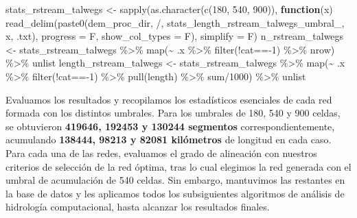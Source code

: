 \documentclass[spanish]{article}
\newenvironment{Shaded}{\begin{snugshade}}{\end{snugshade}}
\newcommand{\AttributeTok}[1]{\textcolor[rgb]{0.77,0.63,0.00}{#1}}
\newcommand{\ControlFlowTok}[1]{\textcolor[rgb]{0.13,0.29,0.53}{\textbf{#1}}}
\newcommand{\DecValTok}[1]{\textcolor[rgb]{0.00,0.00,0.81}{#1}}
\newcommand{\FunctionTok}[1]{\textcolor[rgb]{0.00,0.00,0.00}{#1}}
\newcommand{\NormalTok}[1]{#1}
\newcommand{\OtherTok}[1]{\textcolor[rgb]{0.56,0.35,0.01}{#1}}
\newcommand{\SpecialCharTok}[1]{\textcolor[rgb]{0.00,0.00,0.00}{#1}}
\newcommand{\StringTok}[1]{\textcolor[rgb]{0.31,0.60,0.02}{#1}}
\begin{document}
\begin{Shaded}
\begin{Highlighting}[]
\NormalTok{stats\_rstream\_talwegs }\OtherTok{\textless{}{-}} \FunctionTok{sapply}\NormalTok{(}\FunctionTok{as.character}\NormalTok{(}\FunctionTok{c}\NormalTok{(}\DecValTok{180}\NormalTok{, }\DecValTok{540}\NormalTok{, }\DecValTok{900}\NormalTok{)), }\ControlFlowTok{function}\NormalTok{(x) }
  \FunctionTok{read\_delim}\NormalTok{(}\FunctionTok{paste0}\NormalTok{(dem\_proc\_dir, }\StringTok{\textquotesingle{}/\textquotesingle{}}\NormalTok{, }\StringTok{\textquotesingle{}stats\_length\_rstream\_talwegs\_umbral\_\textquotesingle{}}\NormalTok{, x, }\StringTok{\textquotesingle{}.txt\textquotesingle{}}\NormalTok{),}
             \AttributeTok{progress =}\NormalTok{ F, }\AttributeTok{show\_col\_types =}\NormalTok{ F), }\AttributeTok{simplify =}\NormalTok{ F)}
\NormalTok{n\_rstream\_talwegs }\OtherTok{\textless{}{-}}\NormalTok{ stats\_rstream\_talwegs }\SpecialCharTok{\%\textgreater{}\%} 
  \FunctionTok{map}\NormalTok{(}\SpecialCharTok{\textasciitilde{}}\NormalTok{ .x }\SpecialCharTok{\%\textgreater{}\%} \FunctionTok{filter}\NormalTok{(}\SpecialCharTok{!}\NormalTok{cat}\SpecialCharTok{=={-}}\DecValTok{1}\NormalTok{) }\SpecialCharTok{\%\textgreater{}\%}\NormalTok{ nrow) }\SpecialCharTok{\%\textgreater{}\%}\NormalTok{ unlist}
\NormalTok{length\_rstream\_talwegs }\OtherTok{\textless{}{-}}\NormalTok{ stats\_rstream\_talwegs }\SpecialCharTok{\%\textgreater{}\%}
  \FunctionTok{map}\NormalTok{(}\SpecialCharTok{\textasciitilde{}}\NormalTok{ .x }\SpecialCharTok{\%\textgreater{}\%} \FunctionTok{filter}\NormalTok{(}\SpecialCharTok{!}\NormalTok{cat}\SpecialCharTok{=={-}}\DecValTok{1}\NormalTok{) }\SpecialCharTok{\%\textgreater{}\%} \FunctionTok{pull}\NormalTok{(length) }\SpecialCharTok{\%\textgreater{}\%}\NormalTok{ sum}\SpecialCharTok{/}\DecValTok{1000}\NormalTok{) }\SpecialCharTok{\%\textgreater{}\%}\NormalTok{ unlist}
\end{Highlighting}
\end{Shaded}

Evaluamos los resultados y recopilamos los estadísticos esenciales de
cada red formada con los distintos umbrales. Para los umbrales de 180,
540 y 900 celdas, se obtuvieron \textbf{419646, 192453 y 130244
segmentos} correspondientemente, acumulando \textbf{138444, 98213 y
82081 kilómetros} de longitud en cada caso. Para cada una de las redes,
evaluamos el grado de alineación con nuestros criterios de selección de
la red óptima, tras lo cual elegimos la red generada con el umbral de
acumulación de 540 celdas. Sin embargo, mantuvimos las restantes en la
base de datos y les aplicamos todos los subsiguientes algoritmos de
análisis de hidrología computacional, hasta alcanzar los resultados
finales.
\end{document}
